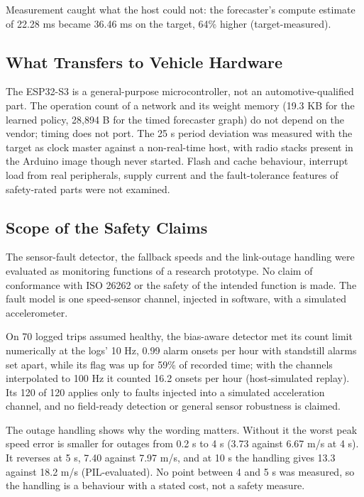 \documentclass{ieeeaccess}
\begin{document}
Measurement caught what the host could not: the forecaster's compute estimate of 22.28 ms became 36.46 ms on the target, 64\% higher (target-measured).

\subsection{What Transfers to Vehicle Hardware}

The ESP32-S3 is a general-purpose microcontroller, not an automotive-qualified part. The operation count of a network and its weight memory (19.3 KB for the learned policy, 28,894 B for the timed forecaster graph) do not depend on the vendor; timing does not port. The 25 \textmu{}s period deviation was measured with the target as clock master against a non-real-time host, with radio stacks present in the Arduino image though never started. Flash and cache behaviour, interrupt load from real peripherals, supply current and the fault-tolerance features of safety-rated parts were not examined.

\subsection{Scope of the Safety Claims}

The sensor-fault detector, the fallback speeds and the link-outage handling were evaluated as monitoring functions of a research prototype. No claim of conformance with ISO 26262 or the safety of the intended function is made. The fault model is one speed-sensor channel, injected in software, with a simulated accelerometer.

On 70 logged trips assumed healthy, the bias-aware detector met its count limit numerically at the logs' 10 Hz, 0.99 alarm onsets per hour with standstill alarms set apart, while its flag was up for 59\% of recorded time; with the channels interpolated to 100 Hz it counted 16.2 onsets per hour (host-simulated replay). Its 120 of 120 applies only to faults injected into a simulated acceleration channel, and no field-ready detection or general sensor robustness is claimed.

The outage handling shows why the wording matters. Without it the worst peak speed error is smaller for outages from 0.2 s to 4 s (3.73 against 6.67 m/s at 4 s). It reverses at 5 s, 7.40 against 7.97 m/s, and at 10 s the handling gives 13.3 against 18.2 m/s (PIL-evaluated). No point between 4 and 5 s was measured, so the handling is a behaviour with a stated cost, not a safety measure.
\end{document}
